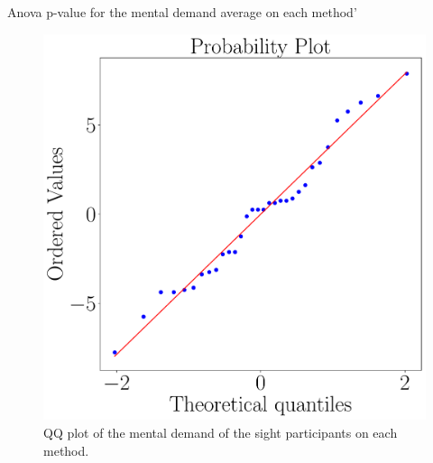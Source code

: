 \begin{table}[!htb]
    \caption{Anova p-value for the mental demand average on each method'}
    \label{tab:blocanova_md_avg_two_way_blind_sight}
\begin{minipage}{0.45\textwidth}
    
\end{minipage}
\begin{minipage}{0.45\textwidth}
        
\end{minipage}
\end{table}

\begin{figure}[!htb]
    \centering
    \begin{minipage}{0.45\textwidth}
        \centering
        \includegraphics[width = \textwidth]{Resultados/Nasa/Figuras/pdf/qqplot_md_avg_two_way_sight.pdf}
        \caption{QQ plot of the mental demand of the sight participants on each method.}
        \label{fig:qqplot_md_avg_two_way_sight}
    \end{minipage}
    \begin{minipage}{0.075\textwidth}

\end{minipage}
\end{figure}
